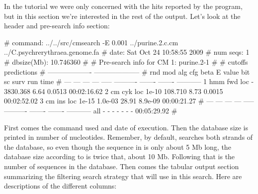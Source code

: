 
In the tutorial we were only concerned with the hits reported by the
program, but in this section we're interested in the rest of the
output. Let's look at the header and pre-search info section:

\newpage

\begin{sreoutput}
# command:    ../../src/cmsearch -E 0.001 ../purine.2.c.cm ../C.psychrerythraea.genome.fa
# date:       Sat Oct 24 10:58:55 2009
# num seqs:   1
# dbsize(Mb): 10.746360
#
# Pre-search info for CM 1: purine.2-1
#
#                                  cutoffs            predictions     
#                            -------------------  --------------------
# rnd  mod  alg  cfg   beta     E value   bit sc     surv     run time
# ---  ---  ---  ---  -----  ----------  -------  -------  -----------
    1  hmm  fwd  loc      -    3830.368     6.64   0.0513  00:02:16.62
    2   cm  cyk  loc  1e-10     108.710     8.73   0.0015  00:02:52.02
    3   cm  ins  loc  1e-15     1.0e-03    28.91  8.9e-09  00:00:21.27
# ---  ---  ---  ---  -----  ----------  -------  -------  -----------
  all    -    -    -      -           -        -        -  00:05:29.92
#
\end{sreoutput}

First comes the command used and date of execution. Then the database
size is printed in number of nucleotides. Remember, by default,
 searches both strands of the database, so even though
the sequence in  is only about 5 Mb
long, the database size according to  is twice that,
about 10 Mb. Following that is the number of sequences in the
database. Then comes the tabular output section summarizing the
filtering search strategy that  will use in this
search. Here are descriptions of the different columns:

